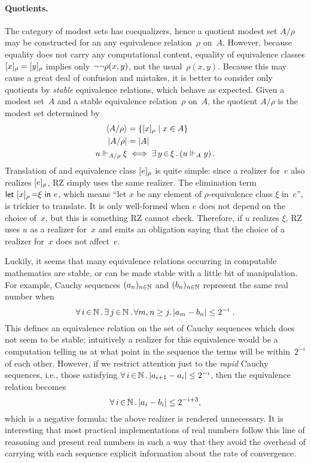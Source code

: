 \paragraph{Quotients.}
%
The category of modest sets has coequalizers, hence a quotient modest
set $A/\rho$ may be constructed for an any equivalence relation~$\rho$
on~$A$. However, because equality does not carry any computational
content, equality of equivalence classes $[x]_{\rho} =
[y]_{\rho}$ implies only $\lnot \lnot \rho(x,y)$, not the
usual~$\rho(x,y)$. Because this may cause a great deal of confusion
and mistakes, it is better to consider only quotients by \emph{stable}
equivalence relations, which behave as expected.
%
Given a modest set~$A$ and a stable equivalence relation~$\rho$
on~$A$, the quotient $A/\rho$ is the modest set determined by
%
\begin{align*}
  \langle A/\rho \rangle &= \{[x]_{\rho} \mid x \in A\} \\
  |A/\rho| &= |A| \\
  u \Vdash_{A/\rho} \xi &\iff \exists\, y \,{\in}\, \xi\,.\left(u \Vdash_A y\right).
\end{align*}
%
Translation of and equivalence class $[e]_{\rho}$ is quite
simple: since a realizer for~$e$ also realizes $[e]_{\rho}$, RZ
simply uses the same realizer. The elimination term
$\textsf{let}\ [x]_{\rho}\,{=}\xi\ \textsf{in}\ e$, which means ``let $x$ be any element
of $\rho$-equivalence class $\xi$ in~$e$'', is trickier to translate.
It is only well-formed when $e$ does not depend on the choice of~$x$,
but this is something RZ cannot check. Therefore, if $u$ realizes
$\xi$, RZ uses $u$ as a realizer for~$x$ and emits an obligation
saying that the choice of a realizer for~$x$ does not affect~$e$.

Luckily, it seems that many equivalence relations occurring in
computable mathematics are stable, or can be made stable with a little
bit of manipulation. For example, Cauchy sequences $(a_n)_{n\in\mathbb{N}}$
and $(b_n)_{n\in\mathbb{N}}$ represent the same real number when
%
\begin{equation}
  \label{eq:cauchy}%
  \xall{i}{\NN}{
    \xsome{j}{\NN}{
      \forall m,n \geq j.\,|a_m - b_n| \leq 2^{-i}
    }
  } \;.
\end{equation}
%
This defines an equivalence relation on the set of Cauchy sequences
which does not seem to be stable; intuitively a realizer for this
equivalence would be a computation telling us at what point
in the sequence the terms will be within~$2^{-i}$ of each other.
%
However, if we restrict attention just to the \emph{rapid} Cauchy
sequences, i.e., those satisfying $\forall\, i \,{\in}\, \mathbb{N}\,.\,|a_{i+1} - a_i| \leq
  2^{-i}$, then the equivalence relation becomes
%
\begin{equation*}
  \forall\, i \,{\in}\, \mathbb{N}\,.\,|a_i - b_i| \leq 2^{-i+3},
\end{equation*}
%
which is a negative formula; the above realizer is rendered
unnecessary. It is interesting that most practical implementations of
real numbers follow this line of reasoning and present real numbers in
such a way that they avoid the overhead of carrying with each sequence
explicit information about the rate of convergence.


